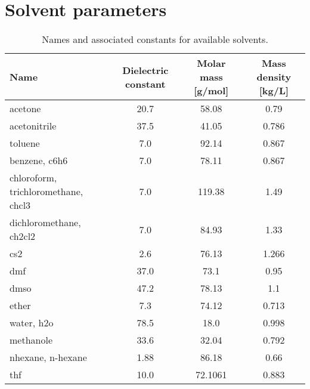 
\chapter{Solvent parameters}
\label{app:solvents}

\begin{table}[htbp]
  \caption{Names and associated constants for available solvents.}
  \begin{tabular}{l*{3}{c}}
    \hline\hline
    Name & Dielectric constant & Molar mass [g/mol] & Mass density [kg/L] \\
    \hline
    acetone & 20.7 & 58.08 & 0.79 \\
    acetonitrile & 37.5 & 41.05 & 0.786 \\
    toluene & 7.0 & 92.14 & 0.867 \\
    benzene, c6h6 & 7.0 & 78.11 & 0.867 \\
    chloroform, trichloromethane, chcl3 & 7.0 & 119.38 & 1.49 \\
    dichloromethane, ch2cl2 & 7.0 & 84.93 & 1.33 \\
    cs2 & 2.6 & 76.13 & 1.266 \\
    dmf & 37.0 & 73.1 & 0.95 \\
    dmso & 47.2 & 78.13 & 1.1 \\
    ether & 7.3 & 74.12 & 0.713 \\
    water, h2o & 78.5 & 18.0 & 0.998 \\
    methanole & 33.6 & 32.04 & 0.792 \\
    nhexane, n-hexane & 1.88 & 86.18 & 0.66 \\
    thf & 10.0 & 72.1061 & 0.883 \\
    \hline\hline
  \end{tabular}
\end{table}
